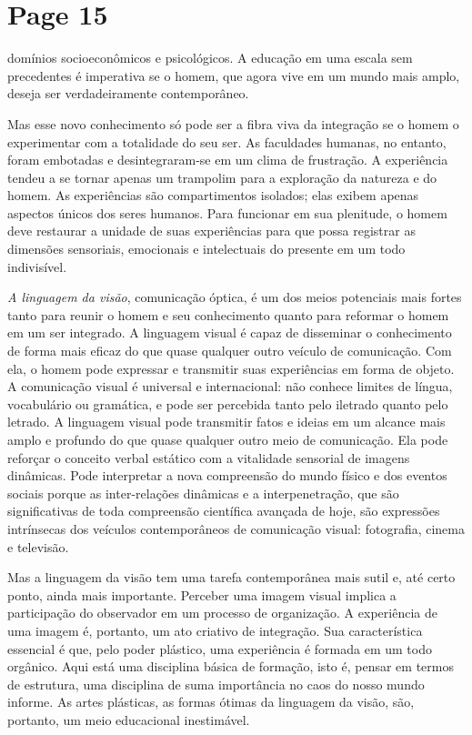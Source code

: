 \documentclass[a4paper]{article}
\begin{document}
\newpage
\section*{Page 15}

domínios socioeconômicos e psicológicos. A educação em uma escala sem precedentes é imperativa se o homem, que agora vive em um mundo mais amplo, deseja ser verdadeiramente contemporâneo.

Mas esse novo conhecimento só pode ser a fibra viva da integração se o homem o experimentar com a totalidade do seu ser. As faculdades humanas, no entanto, foram embotadas e desintegraram-se em um clima de frustração. A experiência tendeu a se tornar apenas um trampolim para a exploração da natureza e do homem. As experiências são compartimentos isolados; elas exibem apenas aspectos únicos dos seres humanos. Para funcionar em sua plenitude, o homem deve restaurar a unidade de suas experiências para que possa registrar as dimensões sensoriais, emocionais e intelectuais do presente em um todo indivisível.

\textit{A linguagem da visão}, comunicação óptica, é um dos meios potenciais mais fortes tanto para reunir o homem e seu conhecimento quanto para reformar o homem em um ser integrado. A linguagem visual é capaz de disseminar o conhecimento de forma mais eficaz do que quase qualquer outro veículo de comunicação. Com ela, o homem pode expressar e transmitir suas experiências em forma de objeto. A comunicação visual é universal e internacional: não conhece limites de língua, vocabulário ou gramática, e pode ser percebida tanto pelo iletrado quanto pelo letrado. A linguagem visual pode transmitir fatos e ideias em um alcance mais amplo e profundo do que quase qualquer outro meio de comunicação. Ela pode reforçar o conceito verbal estático com a vitalidade sensorial de imagens dinâmicas. Pode interpretar a nova compreensão do mundo físico e dos eventos sociais porque as inter-relações dinâmicas e a interpenetração, que são significativas de toda compreensão científica avançada de hoje, são expressões intrínsecas dos veículos contemporâneos de comunicação visual: fotografia, cinema e televisão.

Mas a linguagem da visão tem uma tarefa contemporânea mais sutil e, até certo ponto, ainda mais importante. Perceber uma imagem visual implica a participação do observador em um processo de organização. A experiência de uma imagem é, portanto, um ato criativo de integração. Sua característica essencial é que, pelo poder plástico, uma experiência é formada em um todo orgânico. Aqui está uma disciplina básica de formação, isto é, pensar em termos de estrutura, uma disciplina de suma importância no caos do nosso mundo informe. As artes plásticas, as formas ótimas da linguagem da visão, são, portanto, um meio educacional inestimável.
\end{document}
